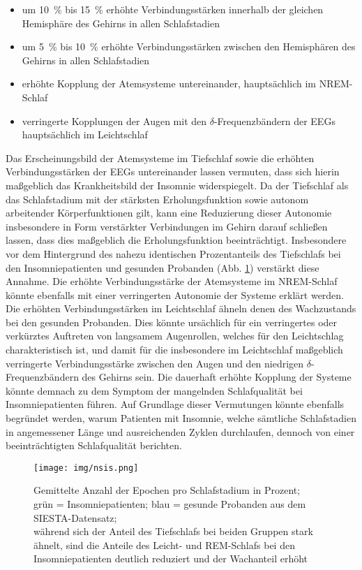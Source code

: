 \begin{itemize}
\item um 10~\% bis 15~\% erhöhte Verbindungsstärken innerhalb der gleichen Hemisphäre des Gehirns in allen Schlafstadien
\item um 5~\% bis 10~\% erhöhte Verbindungsstärken zwischen den Hemisphären des Gehirns in allen Schlafstadien
\item erhöhte Kopplung der Atemsysteme untereinander, hauptsächlich im \acs{NREM}-Schlaf
\item verringerte Kopplungen der Augen mit den $\delta$-Frequenzbändern der \acs{EEG}s hauptsächlich im Leichtschlaf
\end{itemize}

Das Erscheinungsbild der Atemsysteme im Tiefschlaf sowie die erhöhten Verbindungsstärken der \acs{EEG}s untereinander lassen vermuten, dass sich hierin maßgeblich das Krankheitsbild der Insomnie widerspiegelt. Da der Tiefschlaf als das Schlafstadium mit der stärksten Erholungsfunktion sowie autonom arbeitender Körperfunktionen gilt, kann eine Reduzierung dieser Autonomie insbesondere in Form verstärkter Verbindungen im Gehirn darauf schließen lassen, dass dies maßgeblich die Erholungsfunktion beeinträchtigt. Insbesondere vor dem Hintergrund des nahezu identischen Prozentanteils des Tiefschlafs bei den Insomniepatienten und gesunden Probanden (Abb. \ref{fig:nsis}) verstärkt diese Annahme. Die erhöhte Verbindungsstärke der Atemsysteme im \acs{NREM}-Schlaf könnte ebenfalls mit einer verringerten Autonomie der Systeme erklärt werden. Die erhöhten Verbindungsstärken im Leichtschlaf ähneln denen des Wachzustands bei den gesunden Probanden. Dies könnte ursächlich für ein verringertes oder verkürztes Auftreten von langsamem Augenrollen, welches für den Leichtschlag charakteristisch ist, und damit für die insbesondere im Leichtschlaf maßgeblich verringerte Verbindungsstärke zwischen den Augen und den niedrigen $\delta$-Frequenzbändern des Gehirns sein. Die dauerhaft erhöhte Kopplung der Systeme könnte demnach zu dem Symptom der mangelnden Schlafqualität bei Insomniepatienten führen. Auf Grundlage dieser Vermutungen könnte ebenfalls begründet werden, warum Patienten mit Insomnie, welche sämtliche Schlafstadien in angemessener Länge und ausreichenden Zyklen durchlaufen, dennoch von einer beeinträchtigten Schlafqualität berichten.

\begin{figure}[H]
	\centering
	\texttt{[image: img/nsis.png]}
	\caption[Epochen pro Schlafstadium]{Gemittelte Anzahl der Epochen pro Schlafstadium in Prozent;\\grün = Insomniepatienten; blau = gesunde Probanden aus dem SIESTA-Datensatz;\\während sich der Anteil des Tiefschlafs bei beiden Gruppen stark ähnelt, sind die Anteile des Leicht- und \acs{REM}-Schlafs bei den Insomniepatienten deutlich reduziert und der Wachanteil erhöht}
	\label{fig:nsis}
\end{figure}




